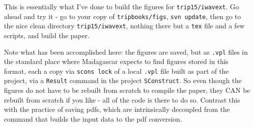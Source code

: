This is essentially what I've done to build the figures for {\tt trip15/iwavext}. Go ahead and try it - go to your copy of {\tt tripbooks/figs}, {\tt svn update}, then go to the nice clean directory {\tt trip15/iwavext}, nothing there but a {\tt tex} file and a few scripts, and build the paper. 

Note what has been accomplished here: the figures are saved, but as {\tt .vpl} files in the standard place where Madagascar expects to find figures stored in this format, each a copy via {\tt scons lock} of a local {\tt .vpl} file built as part of the project, via a {\tt Result} command in the project {\tt SConstruct}. So even though the figures do not have to be rebuilt from scratch to compile the paper, they CAN be rebuilt from scratch if you like - all of the code is there to do so. Contrast this with the practice of saving pdfs, which are intrinsically decoupled from the command that builds the input data to the pdf conversion.